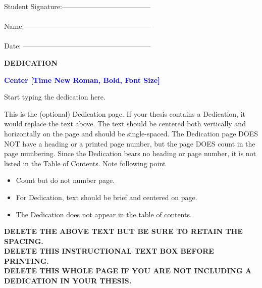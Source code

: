 \documentclass[a4paper,12pt,one side]{report}
\theoremstyle{definition}
\begin{document}
\begin{flushright}
Student Signature:--------------------------------------\\~\\
Name:------------------------------------------------------ \\~\\					
Date: ------------------------------------------------------ \\			\end{flushright}
\NoBgThispage  
  \newpage
	\thispagestyle{empty}
\begin{center}
\textbf {DEDICATION}
\end{center}
\begin{center}
   {\small
   \bfseries \textcolor{blue}{Center [Time New Roman, Bold, Font Size]}
}\\

\end{center}
Start typing the dedication here.
\vspace{2cm}



\begin{tcolorbox}[enhanced jigsaw,
    sharp corners,
    boxrule=0.5pt, 
    colback=blue!30!white,   
    borderline={0.5pt}{-2pt}{black,solid} %
 ]
 \begin{justify}
This is the (optional) Dedication page. If your thesis contains a Dedication, it would replace the text above. The text should be centered both vertically and horizontally on the page and should be single-spaced. The Dedication page DOES NOT have a heading or a printed page number, but the page DOES count in the page numbering. Since the Dedication bears no heading or page number, it is not listed in the Table of Contents.
Note following point
\begin{itemize}
    

\item Count but do not number page.
\item For Dedication, text should be brief and centered on page.
\item The Dedication does not appear in the table of contents.
\end{itemize}
\bf {DELETE THE ABOVE TEXT BUT BE SURE TO RETAIN THE SPACING.\\
DELETE THIS INSTRUCTIONAL TEXT BOX BEFORE PRINTING.\\
DELETE THIS WHOLE PAGE IF YOU ARE NOT INCLUDING A DEDICATION IN YOUR THESIS.}
\end{justify}
\end{tcolorbox}
\end{document}
